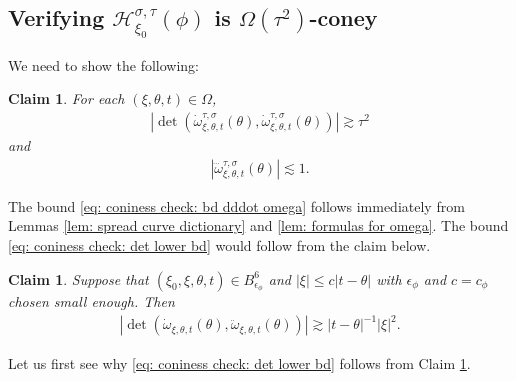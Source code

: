 \documentclass[12pt]{amsart}
\numberwithin{equation}{section}
\newtheorem{claim}[lemma]{Claim}
\newcommand{\1}{\mathbbm{1}}
\newcommand{\Bphi}{B_{\epsilon_\phi}}
\begin{document}
\subsection{Verifying $\mathcal H_{\xi_0}^{\sigma, \tau}(\phi)$ is $\Omega(\tau^2)$-coney}

We need to show the following: 
\begin{claim}\label{claim: coniness check}
    For each $(\xi, \theta, t) \in \Omega$, 
\begin{align}\label{eq: coniness check: det lower bd}
    |\det(\dot \omega^{\tau,\sigma}_{\xi,\theta,t}(\theta), \dot \omega^{\tau,\sigma}_{\xi,\theta,t}(\theta))| \gtrsim \tau^2
\end{align}
and 
\begin{align}\label{eq: coniness check: bd dddot omega}
    |\dddot \omega^{\tau, \sigma}_{\xi,\theta,t}(\theta)| \lesssim 1. 
\end{align}
\end{claim}

The bound \eqref{eq: coniness check: bd dddot omega} follows immediately from Lemmas \ref{lem: spread curve dictionary} and \ref{lem: formulas for omega}. The bound \eqref{eq: coniness check: det lower bd} would follow from the claim below.
\begin{claim}\label{claim: coniness check: det lower bd reduced}
    Suppose that $(\xi_0,\xi,\theta,t) \in \Bphi^6$ and $|\xi| \leq c |t - \theta|$ with $\epsilon_\phi$ and $c = c_\phi$ chosen small enough. Then
    \begin{align}
    |\det(\dot \omega_{\xi,\theta,t}(\theta), \ddot \omega_{\xi,\theta,t}(\theta))| \gtrsim |t - \theta|^{-1} |\xi|^2.
\end{align}
\end{claim}

Let us first see why \eqref{eq: coniness check: det lower bd} follows from Claim \ref{claim: coniness check: det lower bd reduced}. 
\end{document}
